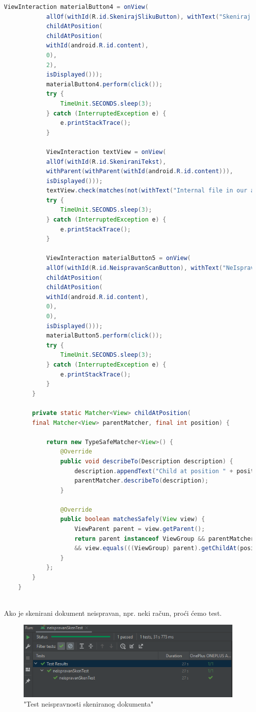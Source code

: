 \begin{lstlisting}[language=Java]
			ViewInteraction materialButton4 = onView(
			allOf(withId(R.id.SkenirajSlikuButton), withText("Skeniraj Sliku"),
			childAtPosition(
			childAtPosition(
			withId(android.R.id.content),
			0),
			2),
			isDisplayed()));
			materialButton4.perform(click());
			try {
				TimeUnit.SECONDS.sleep(3);
			} catch (InterruptedException e) {
				e.printStackTrace();
			}
			
			ViewInteraction textView = onView(
			allOf(withId(R.id.SkeniraniTekst),
			withParent(withParent(withId(android.R.id.content))),
			isDisplayed()));
			textView.check(matches(not(withText("Internal file in our app\nINT9852\n"))));
			try {
				TimeUnit.SECONDS.sleep(3);
			} catch (InterruptedException e) {
				e.printStackTrace();
			}
			
			ViewInteraction materialButton5 = onView(
			allOf(withId(R.id.NeispravanScanButton), withText("NeIspravan Scan"),
			childAtPosition(
			childAtPosition(
			withId(android.R.id.content),
			0),
			0),
			isDisplayed()));
			materialButton5.perform(click());
			try {
				TimeUnit.SECONDS.sleep(3);
			} catch (InterruptedException e) {
				e.printStackTrace();
			}
		}
		
		private static Matcher<View> childAtPosition(
		final Matcher<View> parentMatcher, final int position) {
			
			return new TypeSafeMatcher<View>() {
				@Override
				public void describeTo(Description description) {
					description.appendText("Child at position " + position + " in parent ");
					parentMatcher.describeTo(description);
				}
				
				@Override
				public boolean matchesSafely(View view) {
					ViewParent parent = view.getParent();
					return parent instanceof ViewGroup && parentMatcher.matches(parent)
					&& view.equals(((ViewGroup) parent).getChildAt(position));
				}
			};
		}
	}
	
\end{lstlisting}

Ako je skenirani dokument neispravan, npr. neki račun, proći ćemo test.

\begin{figure}[H]
	\centering
	\includegraphics[scale=1]{./slike/test4.png}
	\caption{"Test neispravnosti skeniranog dokumenta"}
	\label{fig:test4}
\end{figure}\eject


